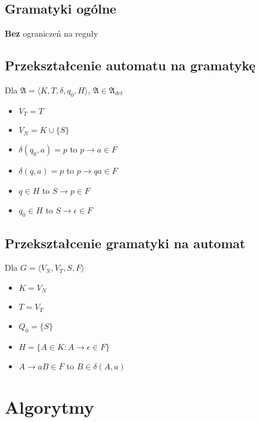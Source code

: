 \documentclass{../notatki}
\begin{document}
\subsection{Gramatyki ogólne}

\textbf{Bez} ograniczeń na reguły

\subsection{Przekształcenie automatu na gramatykę}

Dla $\mathfrak{A} = \langle K,T,\delta,q_0,H \rangle$, $\mathfrak{A}
\in \mathfrak{A}_{det}$

\begin{itemize}
  \item $V_T = T$
  \item $V_N = K \cup \{S\}$
  \item $\delta(q_0, a) = p$ to $p \rightarrow a \in F$
  \item $\delta(q, a) = p$ to $p \rightarrow qa \in F$
  \item $q \in H$ to $S \rightarrow p \in F$
  \item $q_0 \in H$ to $S \rightarrow \epsilon \in F$
\end{itemize}

\subsection{Przekształcenie gramatyki na automat}

Dla $G = \langle V_N, V_T, S, F \rangle$

\begin{itemize}
  \item $K = V_N$
  \item $T = V_T$
  \item $Q_0 = \{S\}$
  \item $H = \{A \in K : A \rightarrow \epsilon \in F\}$
  \item $A \rightarrow aB \in F$ to $B \in \delta(A, a)$
\end{itemize}

\section{Algorytmy}
\end{document}
